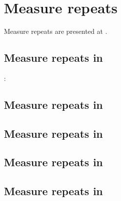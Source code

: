 



\chapter{Measure repeats}\label{Measure repeats}

Measure repeats are presented at .


\section{Measure repeats in \mxsrToMsr{}}

:


\section{Measure repeats in \mxsrToMsr{}}


\section{Measure repeats in \msrToMsr{}}


\section{Measure repeats in \msrToLpsr{}}


\section{Measure repeats in \lpsrToLilypond{}}


